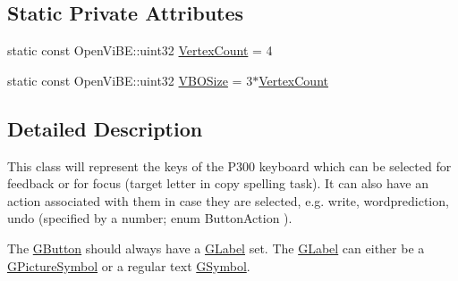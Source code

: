 \subsection*{Static Private Attributes}
\begin{DoxyCompactItemize}
\item 
static const OpenViBE::uint32 \hyperlink{classOpenViBEApplications_1_1GButton_a0642f4b200f1d9107f284e3998d1ff1c}{VertexCount} = 4
\item 
static const OpenViBE::uint32 \hyperlink{classOpenViBEApplications_1_1GButton_ac7e4b8f92a1e10ec6c85cd2e41bd6d79}{VBOSize} = 3$\ast$\hyperlink{classOpenViBEApplications_1_1GButton_a0642f4b200f1d9107f284e3998d1ff1c}{VertexCount}
\end{DoxyCompactItemize}


\subsection{Detailed Description}
This class will represent the keys of the P300 keyboard which can be selected for feedback or for focus (target letter in copy spelling task). It can also have an action associated with them in case they are selected, e.g. write, wordprediction, undo (specified by a number; enum ButtonAction ).\par
 The \hyperlink{classOpenViBEApplications_1_1GButton}{GButton} should always have a \hyperlink{classOpenViBEApplications_1_1GLabel}{GLabel} set. The \hyperlink{classOpenViBEApplications_1_1GLabel}{GLabel} can either be a \hyperlink{classOpenViBEApplications_1_1GPictureSymbol}{GPictureSymbol} or a regular text \hyperlink{classOpenViBEApplications_1_1GSymbol}{GSymbol}. 


